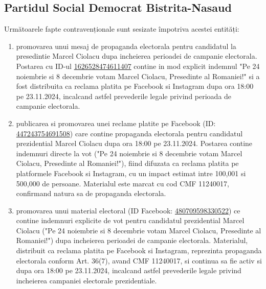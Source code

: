 \documentclass[a4paper,12pt]{article}
\begin{document}
\vspace{0.5cm}

\subsection{Partidul Social Democrat Bistrita-Nasaud}
Următoarele fapte contravenționale sunt sesizate împotriva acestei entități:

\begin{enumerate}[leftmargin=*, label=\arabic*.)]
    \item promovarea unui mesaj de propaganda electorala pentru candidatul la presedintie Marcel Ciolacu dupa incheierea perioadei de campanie electorala. Postarea cu ID-ul \href{https://www.facebook.com/ads/library/?id=1626528474611407}{1626528474611407} contine in mod explicit indemnul "Pe 24 noiembrie si 8 decembrie votam  Marcel Ciolacu, Presedinte al Romaniei!" si a fost distribuita ca reclama platita pe Facebook si Instagram dupa ora 18:00 pe 23.11.2024, incalcand astfel prevederile legale privind perioada de campanie electorala.
    \item publicarea si promovarea unei reclame platite pe Facebook (ID: \href{https://www.facebook.com/ads/library/?id=447243754691508}{447243754691508}) care contine propaganda electorala pentru candidatul prezidential Marcel Ciolacu dupa ora 18:00 pe 23.11.2024. Postarea contine indemnuri directe la vot ("Pe 24 noiembrie si 8 decembrie votam  Marcel Ciolacu, Presedinte al Romaniei!"), fiind difuzata ca reclama platita pe platformele Facebook si Instagram, cu un impact estimat intre 100,001 si 500,000 de persoane. Materialul este marcat cu cod CMF 11240017, confirmand natura sa de propaganda electorala.
    \item promovarea unui material electoral (ID Facebook: \href{https://www.facebook.com/ads/library/?id=480709598330522}{480709598330522}) ce contine indemnuri explicite de vot pentru candidatul prezidential Marcel Ciolacu ("Pe 24 noiembrie si 8 decembrie votam  Marcel Ciolacu, Presedinte al Romaniei!") dupa incheierea perioadei de campanie electorala. Materialul, distribuit ca reclama platita pe Facebook si Instagram, reprezinta propaganda electorala conform Art. 36(7), avand CMF 11240017, si continua sa fie activ si dupa ora 18:00 pe 23.11.2024, incalcand astfel prevederile legale privind incheierea campaniei electorale prezidentiale.
\end{enumerate}

\vspace{0.5cm}
\end{document}

